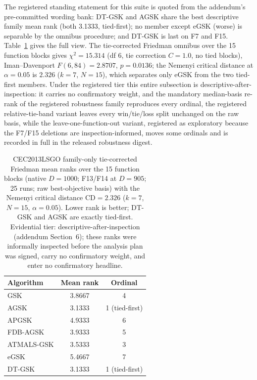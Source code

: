 \documentclass[algorithms,article,submit,moreauthors,pdftex]{Definitions/mdpi}
\newcommand{\dtgsk}{DT-GSK}
\newcommand{\agsk}{AGSK}
\newcommand{\egsk}{eGSK}
\newcommand{\zebra}{}
\begin{document}
The registered standing statement for this suite is quoted from the
addendum's pre-committed wording bank: \dtgsk{} and \agsk{} share the
best descriptive family mean rank (both 3.1333, tied-first); no member
except \egsk{} (worse) is separable by the omnibus procedure; and
\dtgsk{} is last on F7 and F15.  Table~\ref{tab:supp:lsgo:ranks} gives
the full view.  The tie-corrected Friedman omnibus over the 15 function
blocks gives $\chi^{2} = 15.314$ (df 6, tie correction $C = 1.0$, no tied
blocks), Iman--Davenport $F(6, 84) = 2.8707$, $p = 0.0136$; the Nemenyi
critical distance at $\alpha = 0.05$ is $2.326$ ($k = 7$, $N = 15$),
which separates only \egsk{} from the two tied-first members.  Under the
registered tier this entire subsection is descriptive-after-inspection:
it carries no confirmatory weight, and the mandatory median-basis re-rank
of the registered robustness family reproduces every ordinal, the
registered relative-tie-band variant leaves every win/tie/loss split
unchanged on the raw basis, while the
leave-one-function-out variant, registered as exploratory because the
F7/F15 deletions are inspection-informed, moves some ordinals and is
recorded in full in the released robustness digest.

\begin{table}[H]
\caption{CEC2013LSGO family-only tie-corrected Friedman mean ranks over
the 15 function blocks (native $D = 1000$; F13/F14 at $D = 905$; 25 runs;
raw best-objective basis) with the Nemenyi critical distance
$\mathrm{CD} = 2.326$ ($k = 7$, $N = 15$, $\alpha = 0.05$).  Lower rank
is better; \dtgsk{} and \agsk{} are exactly tied-first.  Evidential
tier: descriptive-after-inspection (addendum Section~6); these ranks
were informally inspected before the analysis plan was signed, carry no
confirmatory weight, and enter no confirmatory headline.
}\label{tab:supp:lsgo:ranks}
\centering
\tablesize{\footnotesize}
\zebra
\begin{tabular}{lcc}
\toprule
\textbf{Algorithm} & \textbf{Mean rank} & \textbf{Ordinal} \\
\midrule
GSK & 3.8667 & 4 \\
AGSK & 3.1333 & 1 (tied-first) \\
APGSK & 4.9333 & 6 \\
FDB-AGSK & 3.9333 & 5 \\
ATMALS-GSK & 3.5333 & 3 \\
eGSK & 5.4667 & 7 \\
DT-GSK & 3.1333 & 1 (tied-first) \\
\bottomrule
\end{tabular}
\end{table}
\end{document}
